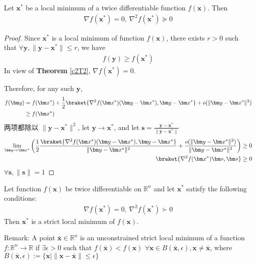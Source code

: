 \begin{theorem}
    Let $\bm x^*$ be a local minimum of a twice differentiable function $f(\bm x)$. Then 
    \begin{align*}
        \nabla f(\bm x^*)=0,\ \nabla^2 f(\bm x^*)\succeq 0
    \end{align*}
\end{theorem}
\begin{proof}
    Since $\bm x^*$ is a local minimum of function $f(\bm x)$, there exists $r>0$ such that $\forall \bm y, \|\bm y-\bm x^*\|\le r$, we have
    \begin{align*}
        f(\bm y)\ge f(\bm x^*)
    \end{align*}
    In view of \textbf{Theorem} \ref{c2T2}, $\nabla f(\bm x^*)=0$. 

    Therefore, for any such $\bm y$,
    \begin{align*}
        f(\bm y)&=f(\bm x^*)+\frac{1}{2}\braket{\nabla^2 f(\bm x^*)(\bm y-\bm x^*),\bm y-\bm x^*}+o(\|\bm y-\bm x^*\|^2)\\
        &\ge f(\bm x^*)
    \end{align*}
    两项都除以 $\|\bm y-\bm x^*\|^2$, let $\bm y\to \bm x^*$, and let $\bm s=\frac{\bm y-\bm x^*}{\|\bm y-\bm x^*\|}$
    \begin{align*}
        \lim_{\bm y\to \bm x^*}\left(\frac{1}{2}\frac{\braket{\nabla^2 f(\bm x^*)(\bm y-\bm x^*),\bm y-\bm x^*}}{\|\bm y-\bm x^*\|^2}+\frac{o(\|\bm y-\bm x^*\|^2)}{\|\bm y-\bm x^*\|^2}\right)&\ge 0\\
        \braket{\nabla^2 f(\bm x^*)\bm s,\bm s}&\ge 0
    \end{align*}
    $\forall \bm s, \|\bm s\|=1$
\end{proof}
\begin{theorem}
    Let function $f(\bm x)$ be twice differentiable on $\mathbb{R}^n$ and let $\bm x^*$ satisfy the following conditions:
    \begin{align*}
        \nabla f(\bm x^*)=0,\ \nabla^2 f(\bm x^*)\succ 0
    \end{align*}
    Then $\bm x^*$ is a strict local minimum of $f(\bm x)$. 
\end{theorem}

Remark: A point $\bar{\bm x}\in \mathbb{R}^n$ is an unconstrained strict local minimum of a function $f:\mathbb{R}^n \to \mathbb{R}$ if $\exists \epsilon >0$ such that $f(\bar{\bm x})<f(\bm x)$ $\forall \bm x\in B(\bar{\bm x}, \epsilon), \bm x\ne \bar{\bm x}$, where $B(\bar{\bm x}, \epsilon):=\{ \bm x|\|\bm x-\bar{\bm x}\|\le \epsilon \}$
    
